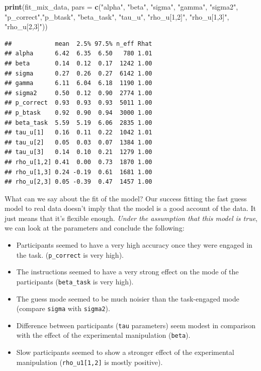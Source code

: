 \documentclass[12pt,]{krantz}
\newenvironment{Shaded}{\begin{snugshade}}{\end{snugshade}}
\newcommand{\DataTypeTok}[1]{\textcolor[rgb]{0.13,0.29,0.53}{#1}}
\newcommand{\KeywordTok}[1]{\textcolor[rgb]{0.13,0.29,0.53}{\textbf{#1}}}
\newcommand{\NormalTok}[1]{#1}
\newcommand{\StringTok}[1]{\textcolor[rgb]{0.31,0.60,0.02}{#1}}
\providecommand{\tightlist}{%
  \setlength{\itemsep}{0pt}\setlength{\parskip}{0pt}}
\theoremstyle{definition}
\theoremstyle{definition}
\theoremstyle{definition}
\theoremstyle{remark}
\begin{document}
\begin{Shaded}
\begin{Highlighting}[]
\KeywordTok{print}\NormalTok{(fit_mix_data, }\DataTypeTok{pars =} \KeywordTok{c}\NormalTok{(}\StringTok{"alpha"}\NormalTok{, }\StringTok{"beta"}\NormalTok{, }\StringTok{"sigma"}\NormalTok{, }\StringTok{"gamma"}\NormalTok{, }\StringTok{"sigma2"}\NormalTok{,}
                              \StringTok{"p_correct"}\NormalTok{,}\StringTok{"p_btask"}\NormalTok{, }\StringTok{"beta_task"}\NormalTok{, }\StringTok{"tau_u"}\NormalTok{,}
                              \StringTok{"rho_u[1,2]"}\NormalTok{, }\StringTok{"rho_u[1,3]"}\NormalTok{, }\StringTok{"rho_u[2,3]"}\NormalTok{))}
\end{Highlighting}
\end{Shaded}

\begin{verbatim}
##            mean  2.5% 97.5% n_eff Rhat
## alpha      6.42  6.35  6.50   780 1.01
## beta       0.14  0.12  0.17  1242 1.00
## sigma      0.27  0.26  0.27  6142 1.00
## gamma      6.11  6.04  6.18  1190 1.00
## sigma2     0.50  0.12  0.90  2774 1.00
## p_correct  0.93  0.93  0.93  5011 1.00
## p_btask    0.92  0.90  0.94  3000 1.00
## beta_task  5.59  5.19  6.06  2835 1.00
## tau_u[1]   0.16  0.11  0.22  1042 1.01
## tau_u[2]   0.05  0.03  0.07  1384 1.00
## tau_u[3]   0.14  0.10  0.21  1279 1.00
## rho_u[1,2] 0.41  0.00  0.73  1870 1.00
## rho_u[1,3] 0.24 -0.19  0.61  1681 1.00
## rho_u[2,3] 0.05 -0.39  0.47  1457 1.00
\end{verbatim}

What can we say about the fit of the model? Our success fitting the fast guess model to real data doesn't imply that the model is a good account of the data. It just means that it's flexible enough. \emph{Under the assumption that this model is true}, we can look at the parameters and conclude the following:

\begin{itemize}
\tightlist
\item
  Participants seemed to have a very high accuracy once they were engaged in the task. (\texttt{p\_correct} is very high).
\item
  The instructions seemed to have a very strong effect on the mode of the participants (\texttt{beta\_task} is very high).
\item
  The guess mode seemed to be much noisier than the task-engaged mode (compare \texttt{sigma} with \texttt{sigma2}).
\item
  Difference between participants (\texttt{tau} parameters) seem modest in comparison with the effect of the experimental manipulation (\texttt{beta}).
\item
  Slow participants seemed to show a stronger effect of the experimental manipulation (\texttt{rho\_u1{[}1,2{]}} is mostly positive).
\end{itemize}
\end{document}

